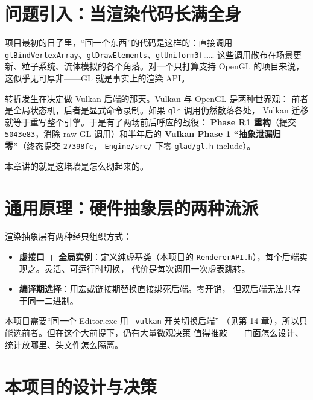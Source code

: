 \section{问题引入：当渲染代码长满全身}

项目最初的日子里，``画一个东西''的代码是这样的：直接调用
\texttt{glBindVertexArray}、\texttt{glDrawElements}、\texttt{glUniform3f}……
这些调用散布在场景更新、粒子系统、流体模拟的各个角落。对一个只打算支持
OpenGL 的项目来说，这似乎无可厚非——GL 就是事实上的渲染 API。

转折发生在决定做 Vulkan 后端的那天。Vulkan 与 OpenGL 是两种世界观：
前者是全局状态机，后者是显式命令录制。如果 \texttt{gl*} 调用仍然散落各处，
Vulkan 迁移就等于重写整个引擎。于是有了两场前后呼应的战役：
\textbf{Phase R1 重构}（提交 \texttt{5043e83}，消除 raw GL 调用）和半年后的
\textbf{Vulkan Phase 1 ``抽象泄漏归零''}（终态提交 \texttt{27398fc}，
\texttt{Engine/src/} 下零 \texttt{glad/gl.h} include）。

本章讲的就是这堵墙是怎么砌起来的。

\section{通用原理：硬件抽象层的两种流派}

渲染抽象层有两种经典组织方式：

\begin{itemize}
  \item \textbf{虚接口 + 全局实例}：定义纯虚基类（本项目的
        \texttt{RendererAPI.h}），每个后端实现之。灵活、可运行时切换，
        代价是每次调用一次虚表跳转。
  \item \textbf{编译期选择}：用宏或链接期替换直接绑死后端。零开销，
        但双后端无法共存于同一二进制。
\end{itemize}

本项目需要``同一个 Editor.exe 用 \texttt{--vulkan} 开关切换后端''
（见第 14 章），所以只能选前者。但在这个大前提下，仍有大量微观决策
值得推敲——门面怎么设计、统计放哪里、头文件怎么隔离。

\section{本项目的设计与决策}

